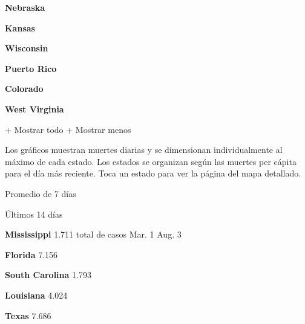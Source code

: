 \href{https://www.nytimes.com/interactive/2020/us/nebraska-coronavirus-cases.html}{}

\textbf{Nebraska}

\href{https://www.nytimes.com/interactive/2020/us/kansas-coronavirus-cases.html}{}

\textbf{Kansas}

\href{https://www.nytimes.com/interactive/2020/us/wisconsin-coronavirus-cases.html}{}

\textbf{Wisconsin}

\href{https://www.nytimes.com/interactive/2020/us/puerto-rico-coronavirus-cases.html}{}

\textbf{Puerto Rico}

\href{https://www.nytimes.com/interactive/2020/us/colorado-coronavirus-cases.html}{}

\textbf{Colorado}

\href{https://www.nytimes.com/interactive/2020/us/west-virginia-coronavirus-cases.html}{}

\textbf{West Virginia}

+ Mostrar todo + Mostrar menos

Los gráficos muestran muertes diarias y se dimensionan individualmente
al máximo de cada estado. Los estados se organizan según las muertes per
cápita para el día más reciente. Toca un estado para ver la página del
mapa detallado.

\href{https://www.nytimes.com/interactive/2020/us/mississippi-coronavirus-cases.html}{}

Promedio de 7 días

Últimos 14 días

\textbf{Mississippi} 1.711 total de casos Mar. 1 Aug. 3

\href{https://www.nytimes.com/interactive/2020/us/florida-coronavirus-cases.html}{}

\textbf{Florida} 7.156

\href{https://www.nytimes.com/interactive/2020/us/south-carolina-coronavirus-cases.html}{}

\textbf{South Carolina} 1.793

\href{https://www.nytimes.com/interactive/2020/us/louisiana-coronavirus-cases.html}{}

\textbf{Louisiana} 4.024

\href{https://www.nytimes.com/interactive/2020/us/texas-coronavirus-cases.html}{}

\textbf{Texas} 7.686

\href{https://www.nytimes.com/interactive/2020/us/nevada-coronavirus-cases.html}{}

